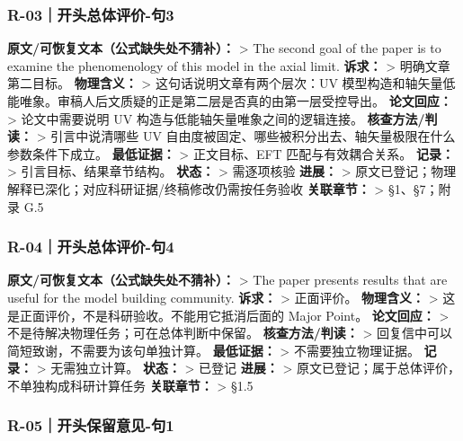 \documentclass[
]{article}
\begin{document}
\subsubsection{R-03｜开头总体评价-句3}\label{r-03ux5f00ux5934ux603bux4f53ux8bc4ux4ef7-ux53e53}

\textbf{原文/可恢复文本（公式缺失处不猜补）：} \textgreater{} The second
goal of the paper is to examine the phenomenology of this model in the
axial limit. \textbf{诉求：} \textgreater{} 明确文章第二目标。
\textbf{物理含义：} \textgreater{} 这句话说明文章有两个层次：UV
模型构造和轴矢量低能唯象。审稿人后文质疑的正是第二层是否真的由第一层受控导出。
\textbf{论文回应：} \textgreater{} 论文中需要说明 UV
构造与低能轴矢量唯象之间的逻辑连接。 \textbf{核查方法/判读：}
\textgreater{} 引言中说清哪些 UV
自由度被固定、哪些被积分出去、轴矢量极限在什么参数条件下成立。
\textbf{最低证据：} \textgreater{} 正文目标、EFT 匹配与有效耦合关系。
\textbf{记录：} \textgreater{} 引言目标、结果章节结构。 \textbf{状态：}
\textgreater{} 需逐项核验 \textbf{进展：} \textgreater{}
原文已登记；物理解释已深化；对应科研证据/终稿修改仍需按任务验收
\textbf{关联章节：} \textgreater{} §1、§7；附录 G.5

\subsubsection{R-04｜开头总体评价-句4}\label{r-04ux5f00ux5934ux603bux4f53ux8bc4ux4ef7-ux53e54}

\textbf{原文/可恢复文本（公式缺失处不猜补）：} \textgreater{} The paper
presents results that are useful for the model building community.
\textbf{诉求：} \textgreater{} 正面评价。 \textbf{物理含义：}
\textgreater{} 这是正面评价，不是科研验收。不能用它抵消后面的 Major
Point。 \textbf{论文回应：} \textgreater{}
不是待解决物理任务；可在总体判断中保留。 \textbf{核查方法/判读：}
\textgreater{} 回复信中可以简短致谢，不需要为该句单独计算。
\textbf{最低证据：} \textgreater{} 不需要独立物理证据。 \textbf{记录：}
\textgreater{} 无需独立计算。 \textbf{状态：} \textgreater{} 已登记
\textbf{进展：} \textgreater{}
原文已登记；属于总体评价，不单独构成科研计算任务 \textbf{关联章节：}
\textgreater{} §1.5

\subsubsection{R-05｜开头保留意见-句1}\label{r-05ux5f00ux5934ux4fddux7559ux610fux89c1-ux53e51}
\end{document}
